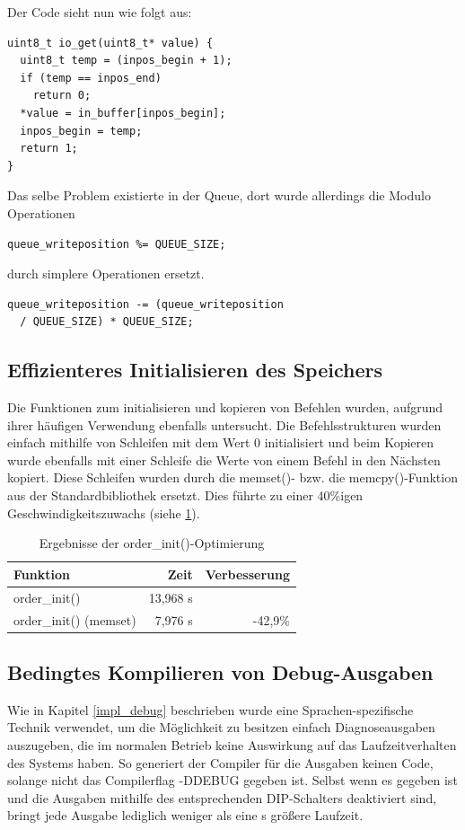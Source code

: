 Der Code sieht nun wie folgt aus:
\begin{verbatim}
uint8_t io_get(uint8_t* value) {
  uint8_t temp = (inpos_begin + 1);
  if (temp == inpos_end)
    return 0;
  *value = in_buffer[inpos_begin];
  inpos_begin = temp;
  return 1;
}
\end{verbatim}
Das selbe Problem existierte in der Queue, dort wurde allerdings die Modulo Operationen
\begin{verbatim}
queue_writeposition %= QUEUE_SIZE;
\end{verbatim}
durch simplere Operationen ersetzt.
\begin{verbatim}
queue_writeposition -= (queue_writeposition
  / QUEUE_SIZE) * QUEUE_SIZE;
\end{verbatim}

\subsection{Effizienteres Initialisieren des Speichers}
Die Funktionen zum initialisieren und kopieren von Befehlen wurden, aufgrund ihrer häufigen Verwendung ebenfalls
untersucht. Die Befehlsstrukturen wurden einfach mithilfe von Schleifen mit dem Wert 0 initialisiert und beim
Kopieren wurde ebenfalls mit einer Schleife die Werte von einem Befehl in den Nächsten kopiert. Diese Schleifen
wurden durch die memset()- bzw. die memcpy()-Funktion aus der Standardbibliothek ersetzt. Dies führte zu einer
40\%igen Geschwindigkeitszuwachs (siehe \ref{order_init_meas}).
\begin{table}[htb]
\begin{center}
	\begin{tabular}{|l||r|r|}
		\hline
		\textbf{Funktion} & \textbf{Zeit} & \textbf{Verbesserung} \\ \hline \hline
		order\_init() & 13,968 \textmu{}s & \\ \hline
		order\_init() (memset) & 7,976 \textmu{}s & -42,9\% \\ \hline
	\end{tabular}
	\caption{\label{order_init_meas} Ergebnisse der order\_init()-Optimierung}
\end{center}
\end{table}

\subsection{Bedingtes Kompilieren von Debug-Ausgaben}
Wie in Kapitel \ref{impl_debug} beschrieben wurde eine Sprachen-spezifische Technik verwendet, um 
die Möglichkeit zu besitzen einfach Diagnoseausgaben auszugeben, die im normalen Betrieb keine Auswirkung
auf das Laufzeitverhalten des Systems haben. So generiert der Compiler für die Ausgaben keinen Code, solange nicht
das Compilerflag -DDEBUG gegeben ist. Selbst wenn es gegeben ist und die Ausgaben mithilfe des entsprechenden DIP-Schalters
deaktiviert sind, bringt jede Ausgabe lediglich weniger als eine \textmu{}s größere Laufzeit.

